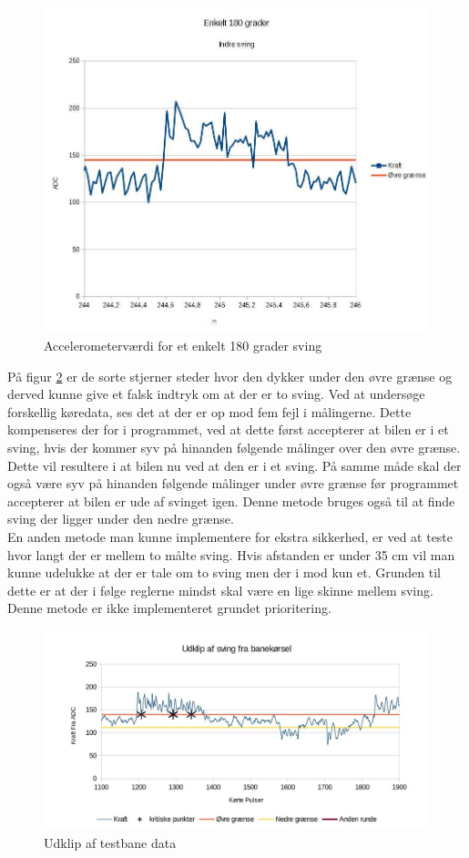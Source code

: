 \begin{figure}[h!]
\center
\includegraphics[scale=0.3]{./Graphics/Enkelt180grader}
\caption{Accelerometerværdi for et enkelt 180 grader sving}
\label{180grader}
\end{figure}

På figur \ref{Stjerne} er de sorte stjerner steder hvor den dykker under den øvre grænse og derved kunne give et falsk indtryk om at der er to sving. Ved at undersøge forskellig køredata, ses det at der er op mod fem fejl i målingerne. Dette kompenseres der for i programmet, ved at dette først accepterer at bilen er i et sving, hvis der kommer syv på hinanden følgende målinger over den øvre grænse. Dette vil resultere i at bilen nu ved at den er i et sving. På samme måde skal der også være syv på hinanden følgende målinger under øvre grænse før programmet accepterer at bilen er ude af svinget igen. Denne metode bruges også til at finde sving der ligger under den nedre grænse. \\ 

En anden metode man kunne implementere for ekstra sikkerhed, er ved at teste hvor langt der er mellem to målte sving. Hvis afstanden er under 35 cm vil man kunne udelukke at der er tale om to sving men der i mod kun et. Grunden til dette er at der i følge reglerne mindst skal være en lige skinne mellem sving. Denne metode er ikke implementeret grundet prioritering.\\

\begin{figure}[h!]
\center
\includegraphics[scale=0.2]{./Graphics/sortestjerne}
\caption{Udklip af testbane data}
\label{Stjerne}
\end{figure}

